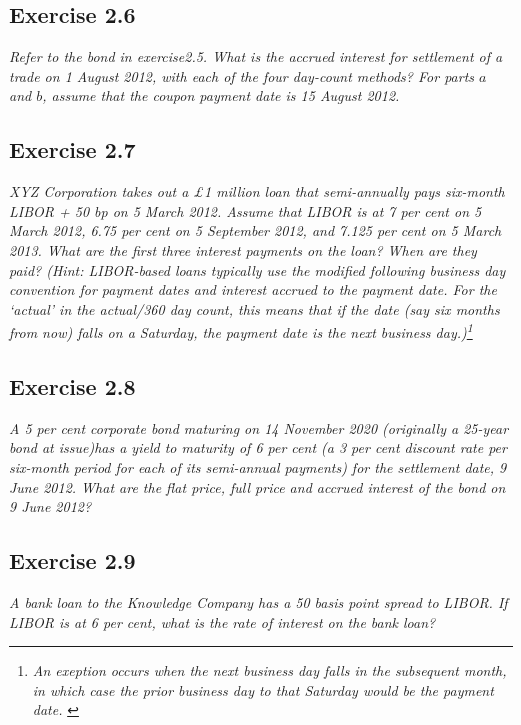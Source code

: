 \documentclass[]{book}
\let\rmarkdownfootnote\footnote%
\def\footnote{\protect\rmarkdownfootnote}
\theoremstyle{definition}
\theoremstyle{definition}
\theoremstyle{remark}
\begin{document}
\subsection{Exercise 2.6}\label{exercise-2.6}

\emph{Refer to the bond in exercise2.5. What is the accrued interest for
settlement of a trade on 1 August 2012, with each of the four day-count
methods? For parts \(a\) and \(b\), assume that the coupon payment date
is 15 August 2012.} \citep[p.56]{book}

\subsection{Exercise 2.7}\label{exercise-2.7}

\emph{XYZ Corporation takes out a £1 million loan that semi-annually
pays six-month LIBOR + 50 bp on 5 March 2012. Assume that LIBOR is at 7
per cent on 5 March 2012, 6.75 per cent on 5 September 2012, and 7.125
per cent on 5 March 2013. What are the first three interest payments on
the loan? When are they paid? (Hint: LIBOR-based loans typically use the
modified following business day convention for payment dates and
interest accrued to the payment date. For the `actual' in the actual/360
day count, this means that if the date (say six months from now) falls
on a Saturday, the payment date is the next business day.)\footnote{\emph{An
  exeption occurs when the next business day falls in the subsequent
  month, in which case the prior business day to that Saturday would be
  the payment date.} \citep[p.56]{book}}} \citep[p.56]{book}

\subsection{Exercise 2.8}\label{exercise-2.8}

\emph{A 5 per cent corporate bond maturing on 14 November 2020
(originally a 25-year bond at issue)has a yield to maturity of 6 per
cent (a 3 per cent discount rate per six-month period for each of its
semi-annual payments) for the settlement date, 9 June 2012. What are the
flat price, full price and accrued interest of the bond on 9 June 2012?}
\citep[p.56]{book}

\subsection{Exercise 2.9}\label{exercise-2.9}

\emph{A bank loan to the Knowledge Company has a 50 basis point spread
to LIBOR. If LIBOR is at 6 per cent, what is the rate of interest on the
bank loan?} \citep[p.56]{book}
\end{document}
